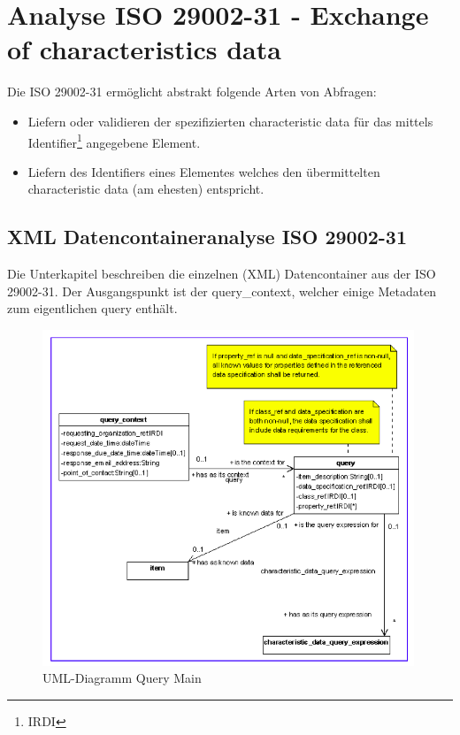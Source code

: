 \section{Analyse ISO 29002-31 - Exchange of characteristics data}

Die ISO 29002-31 ermöglicht abstrakt folgende Arten von Abfragen:
\begin{itemize}
\item Liefern oder validieren der spezifizierten characteristic data für das mittels Identifier\footnote{IRDI} angegebene Element.
\item Liefern des Identifiers eines Elementes welches den übermittelten characteristic data (am ehesten) entspricht. 
\end{itemize}

\subsection{XML Datencontaineranalyse ISO 29002-31}
Die Unterkapitel beschreiben die einzelnen (XML) Datencontainer aus der ISO 29002-31. Der Ausgangspunkt ist der query\_context, welcher einige Metadaten zum eigentlichen query enthält. 

\begin{figure}[htbp]
	\centering
		\includegraphics[width=0.99\textwidth]{images/query_main.png}
		\caption[UML-Diagramm Query Main]{UML-Diagramm Query Main\footnotemark}
	\label{fig:querymain}
\end{figure}

